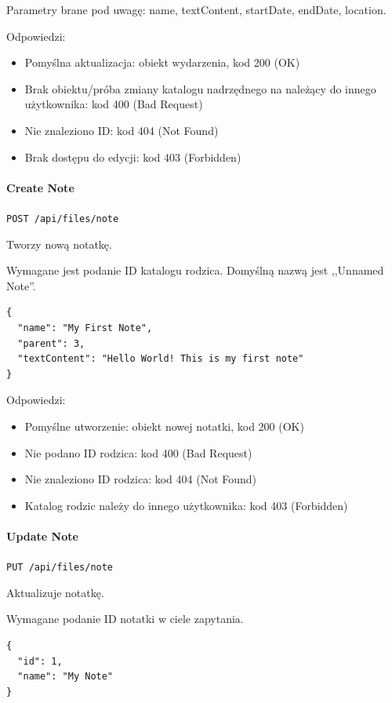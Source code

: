 \documentclass[a4paper,twoside,12pt]{book}
\begin{document}
Parametry brane pod uwagę: name, textContent, startDate, endDate, location.

Odpowiedzi: 
\begin{itemize}
	\item Pomyślna aktualizacja: obiekt wydarzenia, kod 200 (OK) 
	\item Brak obiektu/próba zmiany katalogu nadrzędnego na należący do innego użytkownika: kod 400 (Bad Request) 
	\item Nie znaleziono ID: kod 404 (Not Found) 
	\item Brak dostępu do edycji: kod 403 (Forbidden)
\end{itemize}

\paragraph{Create Note}

\texttt{POST /api/files/note}

Tworzy nową notatkę.

Wymagane jest podanie ID katalogu rodzica. Domyślną nazwą jest ,,Unnamed Note''.

\begin{verbatim}
{
  "name": "My First Note",
  "parent": 3,
  "textContent": "Hello World! This is my first note"
}
\end{verbatim}

Odpowiedzi: 
\begin{itemize}
	\item Pomyślne utworzenie: obiekt nowej notatki, kod 200 (OK) 
	\item Nie podano ID rodzica: kod 400 (Bad Request)
	\item Nie znaleziono ID rodzica: kod 404 (Not Found) 
	\item Katalog rodzic należy do innego użytkownika: kod 403 (Forbidden)
\end{itemize}

\paragraph{Update Note}

\texttt{PUT /api/files/note}

Aktualizuje notatkę.

Wymagane podanie ID notatki w ciele zapytania.

\begin{verbatim}
{
  "id": 1,
  "name": "My Note"
}
\end{verbatim}
\end{document}
